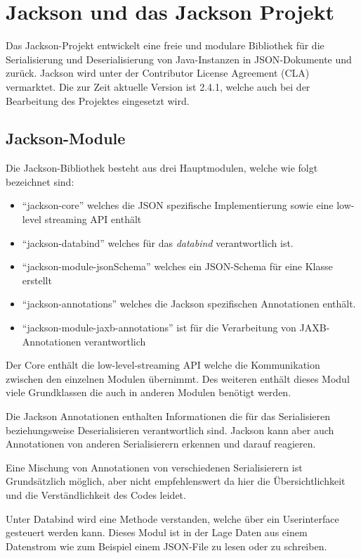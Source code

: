 \section{Jackson und das Jackson Projekt}\label{Jackson}
Das Jackson-Projekt entwickelt eine freie und modulare Bibliothek f\"ur die Serialisierung und Deserialisierung von Java-Instanzen in \ac{JSON}-Dokumente und zur\"uck. Jackson wird unter der Contributor License Agreement (CLA) vermarktet. Die zur Zeit aktuelle Version ist 2.4.1, welche auch bei der Bearbeitung des Projektes eingesetzt wird.

\subsection{Jackson-Module}
Die Jackson-Bibliothek besteht aus drei Hauptmodulen, welche wie folgt bezeichnet sind:
\begin{itemize}
 \item "`jackson-core"' welches die JSON spezifische Implementierung sowie eine low-level streaming API enth\"alt 
 \item "`jackson-databind"' welches f\"ur das \textit{databind} verantwortlich ist.
 \item "`jackson-module-jsonSchema"' welches ein JSON-Schema f\"ur eine Klasse erstellt
 \item "`jackson-annotations"' welches die Jackson spezifischen Annotationen enth\"alt.
 \item "`jackson-module-jaxb-annotations"' ist f\"ur die Verarbeitung von JAXB-Annotationen verantwortlich
\end{itemize}
Der Core enth\"alt die low-level-streaming API welche die Kommunikation zwischen den einzelnen Modulen \"ubernimmt. Des weiteren enth\"alt dieses Modul viele Grundklassen die auch in anderen Modulen ben\"otigt werden.

Die Jackson Annotationen enthalten Informationen die f\"ur das Serialisieren beziehungsweise Deserialisieren verantwortlich sind.
Jackson kann aber auch Annotationen von anderen Serialisierern erkennen und darauf reagieren.

Eine Mischung von Annotationen von verschiedenen Serialisierern ist Grunds\"atzlich m\"oglich, aber nicht empfehlenswert da hier die \"Ubersichtlichkeit und die Verst\"andlichkeit des Codes leidet.

Unter Databind wird eine Methode verstanden, welche \"uber ein Userinterface gesteuert werden kann.
Dieses Modul ist in der Lage Daten aus einem Datenstrom wie zum Beispiel einem JSON-File zu lesen oder zu schreiben.

